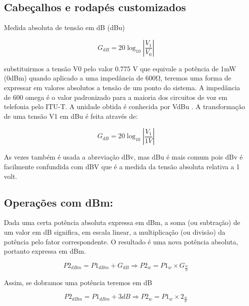 \documentclass[
	article,			%
	11pt,				%
	oneside,			%
	a4paper,			%
	english,			%
	brazil,				%
	sumario=tradicional
	]{abntex2}
\begin{document}
    
\subsection{Cabeçalhos e rodapés customizados}

    Medida absoluta de tensão em dB (dBu)
    
    \begin{equation}
         {\displaystyle G_{dB}} = 20\log_{10}|\frac{{\displaystyle V_{1}}}{{\displaystyle V_{0}}}|
    \end{equation}
    
    substituirmos a tensão V0
 pelo valor 0.775 V que equivale a potência
de 1mW (0dBm) quando aplicado a uma impedância de 600Ω, teremos
uma forma de expressar em valores absolutos a tensão de um ponto do
sistema. A impedância de 600 omega
é o valor padronizado para a maioria
dos circuitos de voz em telefonia pelo ITU-T. A unidade obtida é conhecida por VdBu . A transformação de uma tensão V1
 em dBu é feita
através de:

\begin{equation}
     {\displaystyle G_{dB}} = 20\log_{10}|\frac{{\displaystyle V_{1}}}{1V}|
\end{equation}

As vezes também é usada a abreviação dBv, mas dBu é mais comum
pois dBv é facilmente confundida com dBV que é a medida da tensão
absoluta relativa a 1 volt.


\subsection{Operações com dBm:
}
    Dada uma certa potência absoluta expressa em dBm, a soma (ou
    subtração) de um valor em dB significa, em escala linear, a multiplicação
    (ou divisão) da potência pelo fator correspondente. O resultado é uma
    nova potência absoluta, portanto expressa em dBm.

    \begin{equation}
        {\displaystyle P2_{dBm}} = {\displaystyle P1_{dBm}} + {\displaystyle G_{dB}} \Rightarrow {\displaystyle P2_{w}} = {\displaystyle P1_{w}} \times {\displaystyle G_{\frac{w}{w}}} 
    \end{equation}
    
    Assim, se dobramos uma potência teremos em dB

    \begin{equation}
        {\displaystyle P2_{dBm}} = {\displaystyle P1_{dBm}} + 3dB \Rightarrow {\displaystyle P2_{w}} = {\displaystyle P1_{w}} \times {\displaystyle 2_{\frac{w}{w}}} 
    \end{equation}
    
\end{document}
